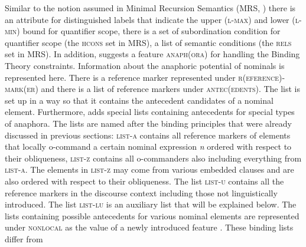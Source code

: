 \documentclass[output=paper
 	        ,biblatex
                ,babelshorthands
                ,newtxmath
                ,draftmode
                ,colorlinks, citecolor=brown
]{langscibook}
\begin{document}
Similar to the notion assumed in Minimal Recursion Semantics (MRS, \citealp*{CFPS2005a}) there is an
attribute for distinguished labels that indicate the upper (\textsc{l-max}) and lower
(\textsc{l-min}) bound for quantifier scope, there is a set of subordination condition for
quantifier scope (the \textsc{hcons} set in MRS), a list of semantic conditions (the \textsc{rels}
set in MRS). In addition, \citeauthor{Branco2002a} suggests a feature \textsc{anaph(ora)} for handling
the Binding Theory constraints. Information about the anaphoric potential of nominals is represented
here. There is a reference marker represented under \textsc{r(eference)-mark(er)} and there is a list
of reference markers under \textsc{antec(edents)}. The list is set up in a way so that it contains
the antecedent candidates of a nominal element. Furthermore, \citeauthor{Branco2002a} adds special
lists containing antecedents for special types of anaphora. The lists are named after the binding
principles that were already discussed in previous sections: \textsc{list-a} contains all reference
markers of elements that locally o-command a certain nominal expression \emph{n} ordered with
respect to their obliqueness, \textsc{list-z} contains all o-commanders also including everything
from \textsc{list-a}. The elements in \textsc{list-z} may come from various
embedded clauses and are also ordered with respect to their obliqueness. The list \textsc{list-u}
contains all the reference markers in the discourse context including those not linguistically
introduced. The list \textsc{list-lu} is an auxiliary list that will be explained below.
\ea
{}
\z
The lists containing possible antecedents for various nominal elements are represented under
\textsc{nonlocal} as the value of a newly introduced feature . These binding lists differ from
\end{document}
